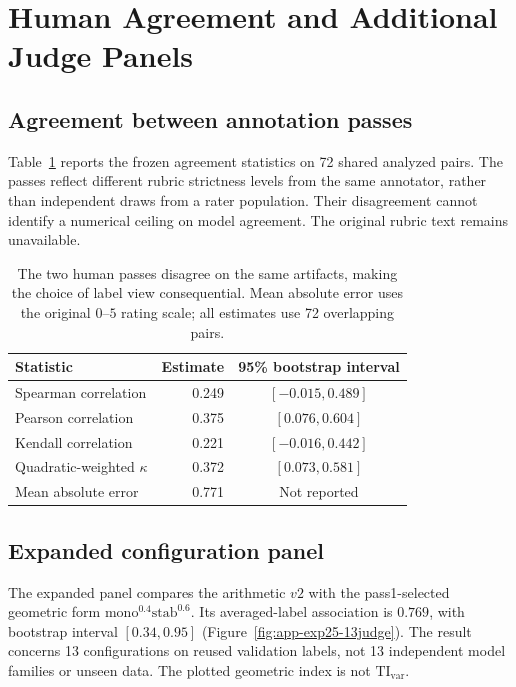 \section{Human Agreement and Additional Judge Panels}\label{app:exp16-exp17}
\subsection{Agreement between annotation passes}\label{app:human-agreement}
Table~\ref{tab:app-human-human-ceiling} reports the frozen agreement statistics on 72 shared analyzed pairs.
The passes reflect different rubric strictness levels from the same annotator, rather than independent draws from a rater population.
Their disagreement cannot identify a numerical ceiling on model agreement.
The original rubric text remains unavailable.

\begin{table}[H]
\centering\small
\begin{tabular}{@{}lrc@{}}
\toprule
Statistic & Estimate & 95\% bootstrap interval \\
\midrule
Spearman correlation & 0.249 & $[-0.015,0.489]$ \\
Pearson correlation & 0.375 & $[0.076,0.604]$ \\
Kendall correlation & 0.221 & $[-0.016,0.442]$ \\
Quadratic-weighted $\kappa$ & 0.372 & $[0.073,0.581]$ \\
Mean absolute error & 0.771 & Not reported \\
\bottomrule
\end{tabular}
\caption{The two human passes disagree on the same artifacts, making the choice of label view consequential.
Mean absolute error uses the original $0$--$5$ rating scale; all estimates use 72 overlapping pairs.}
\label{tab:app-human-human-ceiling}
\end{table}

\subsection{Expanded configuration panel}\label{app:expanded-panel}
The expanded panel compares the arithmetic $v2$ with the pass1-selected geometric form $\mathrm{mono}^{0.4}\mathrm{stab}^{0.6}$.
Its averaged-label association is $0.769$, with bootstrap interval $[0.34,0.95]$ (Figure~\ref{fig:app-exp25-13judge}).
The result concerns 13 configurations on reused validation labels, not 13 independent model families or unseen data.
The plotted geometric index is not $\mathrm{TI}_{\mathrm{var}}$.

